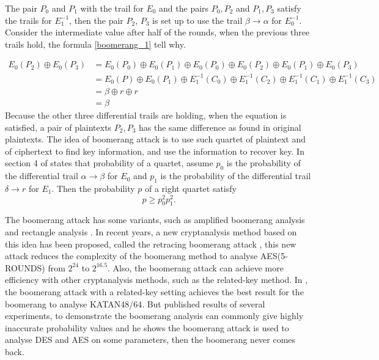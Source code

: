 The pair $P_0$ and $P_1$ with the trail for $E_0$ and the pairs $P_0,P_2$ and $P_1,P_3$ satisfy the trails for $E_1^{-1}$, then the pair $P_2$, $P_3$ is set up to use the trail $\beta\to\alpha$ for $E_0^{-1}$. Consider the intermediate value after half of the rounds, when the previous three trails hold, the formula \ref{boomerang_1} tell why.

\begin{equation}
    \begin{aligned}
        \label{boomerang_1}
        E_0(P_2)\oplus E_0(P_3)&=E_0(P_0)\oplus E_0(P_1)\oplus E_0(P_0)\oplus E_0(P_2) \oplus E_0(P_1) \oplus E_0(P_3)\\
        &=E_0(P)\oplus E_0(P_1)\oplus E_1^{-1}(C_0)\oplus E_1^{-1}(C_2)\oplus E_1^{-1}(C_1)\oplus E_1^{-1}(C_3)\\
        &=\beta \oplus r \oplus r\\
        &=\beta
    \end{aligned}
\end{equation}
Because the other three differential trails are holding, when the equation is satisfied, a pair of plaintexts $P_2,P_3$ has the same difference as found in original plaintexts. The idea of boomerang attack is to use such quartet of plaintext and of ciphertext to find key information, and use the information to recover key. In section 4 of \cite{10.1007/3-540-48519-8_12} states that probability of a quartet, assume $p_0$ is the probability of the differential trail $\alpha\to\beta$ for $E_0$ and $p_1$ is the probability of the differential trail $\delta\to r$ for $E_1$. Then the probability $p$ of a right quartet satisfy
\begin{equation}
    p\ge p_0^2p_1^2.
\end{equation}

The boomerang attack has some variants, such as amplified boomerang analysis \cite{kelsey2000amplified} and rectangle analysis \cite{biham2001rectangle}. In recent years, a new cryptanalysis method \cite{dunkelman2020retracing} based on this idea has been proposed, called the retracing boomerang attack , this new attack reduces the complexity of the boomerang method to analyse AES(5-ROUNDS) from $2^{24}$ to $2^{16.5}$. Also, the boomerang attack can achieve more efficiency with other cryptanalysis methods, such as the related-key method. In \cite{inproceedings}, the boomerang attack with a related-key setting achieves the best result for the boomerang to analyse KATAN48/64. But \cite{5730575} published results of several experiments, to demonstrate the boomerang analysis can commonly give highly inaccurate probability values and he shows the boomerang attack is used to analyse DES and AES on some parameters, then the boomerang never comes back.

